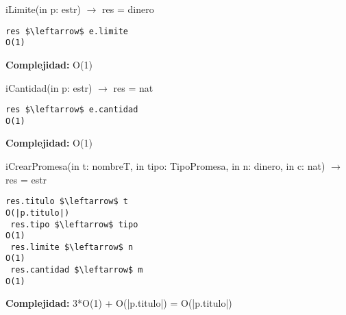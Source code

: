 iLimite(in p: estr) $\rightarrow$ res = dinero
\begin{lstlisting}[mathescape]
 res $\leftarrow$ e.limite                                                                O(1)
\end{lstlisting}
\textbf{Complejidad:} O(1)


iCantidad(in p: estr) $\rightarrow$ res = nat
\begin{lstlisting}[mathescape]
 res $\leftarrow$ e.cantidad                                                              O(1)
\end{lstlisting}
\textbf{Complejidad:} O(1)

iCrearPromesa(in t: nombreT, in tipo: TipoPromesa, in n: dinero, in c: nat) $\rightarrow$ res = estr
\begin{lstlisting}[mathescape]
 res.titulo $\leftarrow$ t                                                            O(|p.titulo|)
 res.tipo $\leftarrow$ tipo                                                               O(1)
 res.limite $\leftarrow$ n                                                                O(1)
 res.cantidad $\leftarrow$ m                                                              O(1)
\end{lstlisting}
\textbf{Complejidad:} 3*O(1) + O(|p.titulo|) = O(|p.titulo|)


